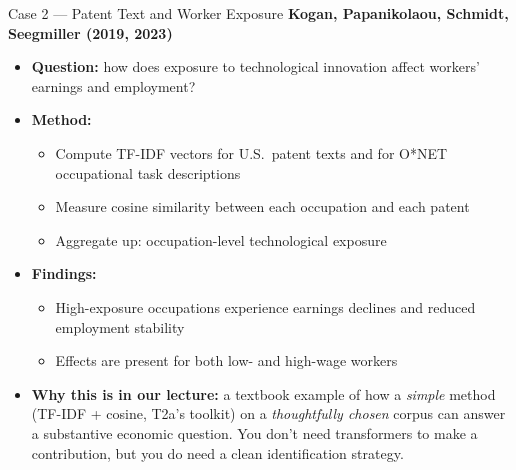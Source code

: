 \begin{frame}{Case 2 --- Patent Text and Worker Exposure}
\textbf{Kogan, Papanikolaou, Schmidt, Seegmiller (2019, 2023)}

\medskip
\begin{itemize}
\item \textbf{Question:} how does exposure to technological innovation affect workers' earnings and employment?

\medskip
\item \textbf{Method:}
\begin{itemize}
    \item Compute TF-IDF vectors for U.S.\ patent texts and for O*NET occupational task descriptions
    \item Measure cosine similarity between each occupation and each patent
    \item Aggregate up: occupation-level technological exposure
\end{itemize}

\medskip
\item \textbf{Findings:}
\begin{itemize}
    \item High-exposure occupations experience earnings declines and reduced employment stability
    \item Effects are present for both low- and high-wage workers
\end{itemize}

\medskip
\item \textbf{Why this is in our lecture:} a textbook example of how a \emph{simple} method (TF-IDF + cosine, T2a's toolkit) on a \emph{thoughtfully chosen} corpus can answer a substantive economic question. You don't need transformers to make a contribution, but you do need a clean identification strategy.
\end{itemize}
\end{frame}

